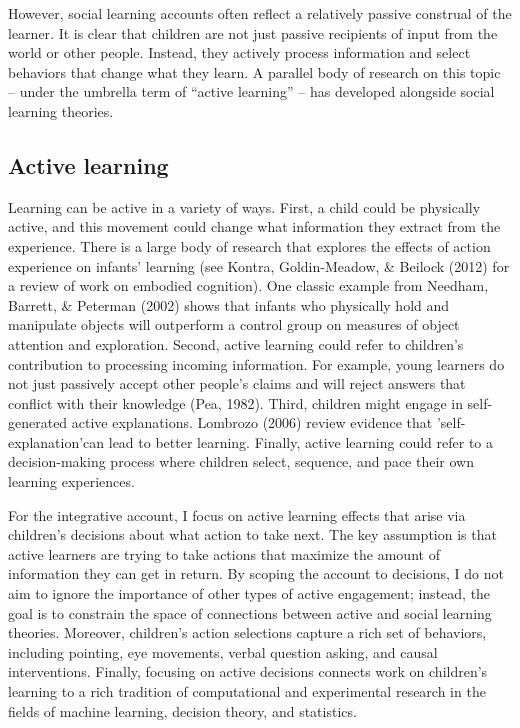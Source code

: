 \documentclass[oneside]{report}
\begin{document}
However, social learning accounts often reflect a relatively passive
construal of the learner. It is clear that children are not just passive
recipients of input from the world or other people. Instead, they
actively process information and select behaviors that change what they
learn. A parallel body of research on this topic -- under the umbrella
term of ``active learning'' -- has developed alongside social learning
theories.

\subsection{Active learning}\label{active-learning}

Learning can be active in a variety of ways. First, a child could be
physically active, and this movement could change what information they
extract from the experience. There is a large body of research that
explores the effects of action experience on infants' learning (see
Kontra, Goldin-Meadow, \& Beilock (2012) for a review of work on
embodied cognition). One classic example from Needham, Barrett, \&
Peterman (2002) shows that infants who physically hold and manipulate
objects will outperform a control group on measures of object attention
and exploration. Second, active learning could refer to children's
contribution to processing incoming information. For example, young
learners do not just passively accept other people's claims and will
reject answers that conflict with their knowledge (Pea, 1982). Third,
children might engage in self-generated active explanations. Lombrozo
(2006) review evidence that 'self-explanation'can lead to better
learning. Finally, active learning could refer to a decision-making
process where children select, sequence, and pace their own learning
experiences.

For the integrative account, I focus on active learning effects that
arise via children's decisions about what action to take next. The key
assumption is that active learners are trying to take actions that
maximize the amount of information they can get in return. By scoping
the account to decisions, I do not aim to ignore the importance of other
types of active engagement; instead, the goal is to constrain the space
of connections between active and social learning theories. Moreover,
children's action selections capture a rich set of behaviors, including
pointing, eye movements, verbal question asking, and causal
interventions. Finally, focusing on active decisions connects work on
children's learning to a rich tradition of computational and
experimental research in the fields of machine learning, decision
theory, and statistics.
\end{document}
